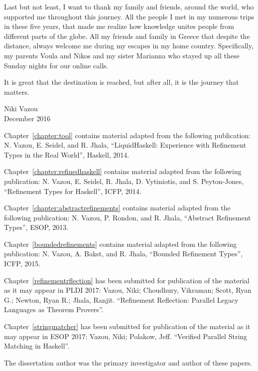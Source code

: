 Last but not least, I want to thank my family and friends, around the world,
who supported me throughout this journey.
%
All the people I met in my numerous trips in these five years, 
that made me realize how knowledge unites people from different parts of the globe.
%
All my friends and family in Greece that despite the distance, 
always welcome me during my escapes in my home country. 
%
Specifically, my parents Voula and Nikos and my sister Marianna
who stayed up all these Sunday nights for our online calls. 

It is great that the destination is reached, 
but after all, it is the journey that matters. 

\begin{flushright}
Niki Vazou \\ December 2016
\end{flushright}

\newpage

Chapter~\ref{chapter:tool} contains material adapted from the following publication:
\noindent N. Vazou, E. Seidel, and R. Jhala,
``LiquidHaskell: Experience with Refinement Types in the Real World'', 
Haskell, 2014.

Chapter~\ref{chapter:refinedhaskell} contains material adapted from the following publication:
\noindent N. Vazou, E. Seidel, R. Jhala, D. Vytiniotis, and S. Peyton-Jones,
``Refinement Types for Haskell'', 
ICFP, 2014.

Chapter~\ref{chapter:abstractrefinements} contains material adapted from the following publication:
\noindent N. Vazou, P. Rondon, and R. Jhala,
``Abstract Refinement Types'', 
ESOP, 2013.

Chapter~\ref{boundedrefinements} contains material adapted from the following publication:
\noindent N. Vazou, A. Bakst, and R. Jhala,
``Bounded Refinement Types'',
ICFP, 2015.


Chapter~\ref{refinementrflection} has been submitted for publication of the material as it may appear in PLDI 2017:
\noindent Vazou, Niki; Choudhury, Vikraman; Scott, Ryan G.; Newton, Ryan R.; Jhala, Ranjit.
``Refinement Reflection: Parallel Legacy Languages as Theorem Provers''.

Chapter~\ref{stringmatcher} has been submitted for publication of the material as it may appear in ESOP 2017:
\noindent Vazou, Niki; Polakow, Jeff.
``Verified Parallel String Matching in Haskell''.

The dissertation author was the primary investigator and author of these papers.